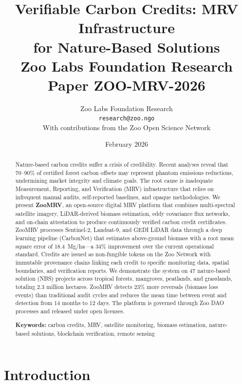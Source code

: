 \documentclass[11pt,a4paper]{article}
\title{%
  \textbf{Verifiable Carbon Credits: MRV Infrastructure\\
  for Nature-Based Solutions}\\[0.5em]
  \large Zoo Labs Foundation Research Paper ZOO-MRV-2026
}
\author{
  Zoo Labs Foundation Research\\
  \texttt{research@zoo.ngo}\\[0.5em]
  \small With contributions from the Zoo Open Science Network
}
\date{February 2026}
\begin{document}
\maketitle

\begin{abstract}
\noindent
Nature-based carbon credits suffer a crisis of credibility. Recent
analyses reveal that 70--90\% of certified forest carbon offsets may
represent phantom emissions reductions, undermining market integrity and
climate goals. The root cause is inadequate Measurement, Reporting, and
Verification (MRV) infrastructure that relies on infrequent manual
audits, self-reported baselines, and opaque methodologies. We present
\textbf{ZooMRV}, an open-source digital MRV platform that combines
multi-spectral satellite imagery, LiDAR-derived biomass estimation,
eddy covariance flux networks, and on-chain attestation to produce
continuously verified carbon credit certificates. ZooMRV processes
Sentinel-2, Landsat-9, and GEDI LiDAR data through a deep learning
pipeline (CarbonNet) that estimates above-ground biomass with a root
mean square error of 18.4~Mg/ha---a 34\% improvement over the current
operational standard. Credits are issued as non-fungible tokens on the
Zoo Network with immutable provenance chains linking each credit to
specific monitoring data, spatial boundaries, and verification reports.
We demonstrate the system on 47 nature-based solution (NBS) projects
across tropical forests, mangroves, peatlands, and grasslands, totaling
2.3 million hectares. ZooMRV detects 23\% more reversals (biomass loss
events) than traditional audit cycles and reduces the mean time between
event and detection from 14 months to 12 days. The platform is governed
through Zoo DAO processes and released under open licenses.

\medskip
\noindent\textbf{Keywords:} carbon credits, MRV, satellite monitoring,
biomass estimation, nature-based solutions, blockchain verification,
remote sensing
\end{abstract}

\newpage
\tableofcontents
\newpage

\section{Introduction}
\label{sec:introduction}
\end{document}
